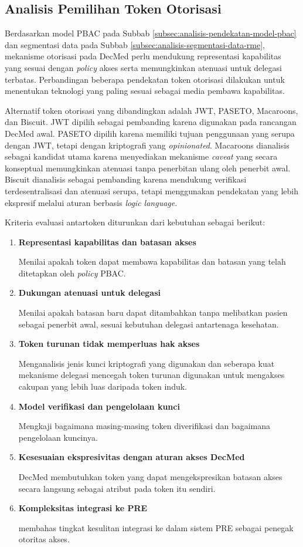 \subsection{Analisis Pemilihan Token Otorisasi}
\label{subsec:analisis-pemilihan-token-otorisasi}

Berdasarkan model PBAC pada Subbab \ref{subsec:analisis-pendekatan-model-pbac} dan segmentasi data pada Subbab \ref{subsec:analisis-segmentasi-data-rme}, mekanisme otorisasi pada DecMed perlu mendukung representasi kapabilitas yang sesuai dengan \textit{policy} akses serta memungkinkan atenuasi untuk delegasi terbatas. Perbandingan beberapa pendekatan token otorisasi dilakukan untuk menentukan teknologi yang paling sesuai sebagai media pembawa kapabilitas.

Alternatif token otorisasi yang dibandingkan adalah JWT, PASETO, Macaroons, dan Biscuit. JWT dipilih sebagai pembanding karena digunakan pada rancangan DecMed awal. PASETO dipilih karena memiliki tujuan penggunaan yang serupa dengan JWT, tetapi dengan kriptografi yang \textit{opinionated}. Macaroons dianalisis sebagai kandidat utama karena menyediakan mekanisme \textit{caveat} yang secara konseptual memungkinkan atenuasi tanpa penerbitan ulang oleh penerbit awal. Biscuit dianalisis sebagai pembanding karena mendukung verifikasi terdesentralisasi dan atenuasi serupa, tetapi menggunakan pendekatan yang lebih ekspresif melalui aturan berbasis \textit{logic language}.

Kriteria evaluasi antartoken diturunkan dari kebutuhan sebagai berikut:
\begin{enumerate}
	\item \textbf{Representasi kapabilitas dan batasan akses}

	      Menilai apakah token dapat membawa kapabilitas dan batasan yang telah ditetapkan oleh \textit{policy} PBAC.
	\item \textbf{Dukungan atenuasi untuk delegasi}

	      Menilai apakah batasan baru dapat ditambahkan tanpa melibatkan pasien sebagai penerbit awal, sesuai kebutuhan delegasi antartenaga kesehatan.
	\item \textbf{Token turunan tidak memperluas hak akses}

	      Menganalisis jenis kunci kriptografi yang digunakan dan seberapa kuat mekanisme delegasi mencegah token turunan digunakan untuk mengakses cakupan yang lebih luas daripada token induk.
	\item \textbf{Model verifikasi dan pengelolaan kunci}

	      Mengkaji bagaimana masing-masing token diverifikasi dan bagaimana pengelolaan kuncinya.
	\item \textbf{Kesesuaian ekspresivitas dengan aturan akses DecMed}

	      DecMed membutuhkan token yang dapat mengekspresikan batasan akses secara langsung sebagai atribut pada token itu sendiri.
	\item \textbf{Kompleksitas integrasi ke PRE}

	      membahas tingkat kesulitan integrasi ke dalam sistem PRE sebagai penegak otoritas akses.
\end{enumerate}

